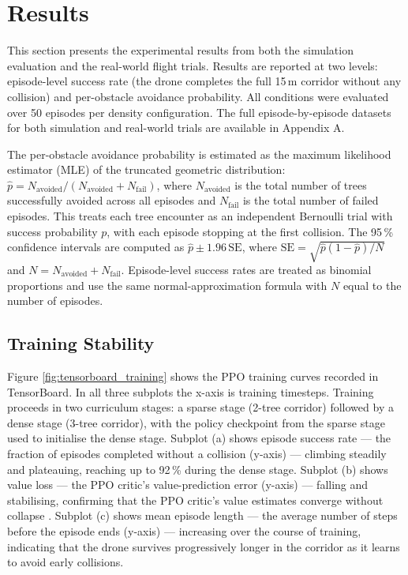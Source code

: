 \documentclass[../main.tex]{subfiles}
\begin{document}
\section{Results}
\justify

This section presents the experimental results from both the simulation evaluation and the real-world flight trials. Results are reported at two levels: episode-level success rate (the drone completes the full 15\,m corridor without any collision) and per-obstacle avoidance probability. All conditions were evaluated over 50 episodes per density configuration. The full episode-by-episode datasets for both simulation and real-world trials are available in Appendix A.

The per-obstacle avoidance probability is estimated as the maximum likelihood estimator (MLE) of the truncated geometric distribution: $\hat{p} = N_{\text{avoided}} / (N_{\text{avoided}} + N_{\text{fail}})$, where $N_{\text{avoided}}$ is the total number of trees successfully avoided across all episodes and $N_{\text{fail}}$ is the total number of failed episodes. This treats each tree encounter as an independent Bernoulli trial with success probability $p$, with each episode stopping at the first collision. The 95\,\% confidence intervals are computed as $\hat{p} \pm 1.96\,\mathrm{SE}$, where $\mathrm{SE} = \sqrt{\hat{p}(1-\hat{p})/N}$ and $N = N_{\text{avoided}} + N_{\text{fail}}$. Episode-level success rates are treated as binomial proportions and use the same normal-approximation formula with $N$ equal to the number of episodes.

\subsection{Training Stability}

Figure \ref{fig:tensorboard_training} shows the PPO training curves recorded in TensorBoard. In all three subplots the x-axis is training timesteps. Training proceeds in two curriculum stages: a sparse stage (2-tree corridor) followed by a dense stage (3-tree corridor), with the policy checkpoint from the sparse stage used to initialise the dense stage. Subplot (a) shows episode success rate --- the fraction of episodes completed without a collision (y-axis) --- climbing steadily and plateauing, reaching up to 92\,\% during the dense stage. Subplot (b) shows value loss --- the PPO critic's value-prediction error (y-axis) --- falling and stabilising, confirming that the PPO critic's value estimates converge without collapse \cite{Schulman2017}. Subplot (c) shows mean episode length --- the average number of steps before the episode ends (y-axis) --- increasing over the course of training, indicating that the drone survives progressively longer in the corridor as it learns to avoid early collisions.
\end{document}
